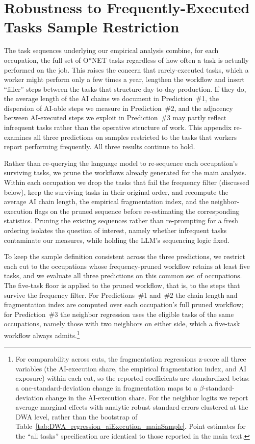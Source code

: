 \section{Robustness to Frequently-Executed Tasks Sample Restriction}
\label{app:frequency_robustness}

The task sequences underlying our empirical analysis combine, for each occupation, the full set of O*NET tasks regardless of how often a task is actually performed on the job.
This raises the concern that rarely-executed tasks, which a worker might perform only a few times a year, lengthen the workflow and insert ``filler'' steps between the tasks that structure day-to-day production.
If they do, the average length of the AI chains we document in Prediction~\#1, the dispersion of AI-able steps we measure in Prediction~\#2, and the adjacency between AI-executed steps we exploit in Prediction~\#3 may partly reflect infrequent tasks rather than the operative structure of work.
This appendix re-examines all three predictions on samples restricted to the tasks that workers report performing frequently.
All three results continue to hold.

Rather than re-querying the language model to re-sequence each occupation's surviving tasks, we prune the workflows already generated for the main analysis.
Within each occupation we drop the tasks that fail the frequency filter (discussed below), keep the surviving tasks in their original order, and recompute the average AI chain length, the empirical fragmentation index, and the neighbor-execution flags on the pruned sequence before re-estimating the corresponding statistics. 
Pruning the existing sequences rather than re-prompting for a fresh ordering isolates the question of interest, namely whether infrequent tasks contaminate our measures, while holding the LLM's sequencing logic fixed.

To keep the sample definition consistent across the three predictions, we restrict each cut to the occupations whose frequency-pruned workflow retains at least five tasks, and we evaluate all three predictions on this common set of occupations.
The five-task floor is applied to the pruned workflow, that is, to the steps that survive the frequency filter.
For Predictions~\#1 and~\#2 the chain length and fragmentation index are computed over each occupation's full pruned workflow; for Prediction~\#3 the neighbor regression uses the eligible tasks of the same occupations, namely those with two neighbors on either side, which a five-task workflow always admits.\footnote{For comparability across cuts, the fragmentation regressions z-score all three variables (the AI-execution share, the empirical fragmentation index, and AI exposure) within each cut, so the reported coefficients are standardized betas: a one-standard-deviation change in fragmentation maps to a $\beta$-standard-deviation change in the AI-execution share. For the neighbor logits we report average marginal effects with analytic robust standard errors clustered at the DWA level, rather than the bootstrap of Table~\ref{tab:DWA_regression_aiExecution_mainSample}. Point estimates for the ``all tasks'' specification are identical to those reported in the main text.}

